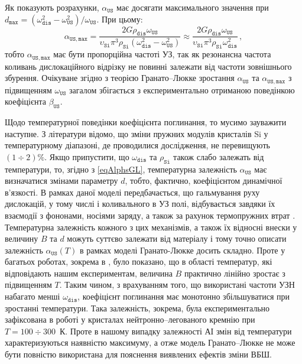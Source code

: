 \documentclass[a4paper,14pt,oneside,openany]{memoir}
\begin{document}
Як показують розрахунки, $\alpha_\mathtt{US}$ має досягати максимального значення при
$d_\mathtt{max}=(\omega_\mathtt{dis}^2 - \omega_\mathtt{US}^2)/\omega_\mathtt{US}$.
При цьому:
\begin{equation}
\label{eqAlGLmax}
\alpha_\mathtt{US,max}=\frac{2G\rho_\mathtt{dis}\omega_\mathtt{US}}{\upsilon_\mathtt{Si}\pi^3\rho_\mathtt{Si}(\omega_\mathtt{dis}^2-\omega_\mathtt{US}^2)}
\approx\frac{2G\rho_\mathtt{dis}\omega_\mathtt{US}}{\upsilon_\mathtt{Si}\pi^3\rho_\mathtt{Si}\omega_\mathtt{dis}^2}\,,
\end{equation}
тобто $\alpha_\mathtt{US,max}$ має бути пропорційна частоті УЗ,
так як резонансна частота коливань дислокаційного відрізку не повинні залежати від частоти зовнішнього збурення.
Очікуване згідно з теорією Гранато--Люкке зростання $\alpha_\mathtt{US}$ та $\alpha_\mathtt{US,max}$ з підвищенням $\omega_\mathtt{US}$ загалом
збігається з експериментально отриманою поведінкою коефіцієнта $\beta_\mathtt{US}$.

Щодо температурної поведінки коефіцієнта поглинання, то мусимо зауважити наступне.
З літератури \cite{Si_C:Temp} відомо, що зміни пружних модулів кристалів Si у температурному діапазоні, де проводилися дослідження, не перевищують $(1\div2)\%$.
Якщо припустити, що $\omega_\mathtt{dis}$ та $\rho_\mathtt{Si}$ також слабо залежать від температури, то, згідно з \eqref{eqAlphsGL}, температурна залежність $\alpha_\mathtt{US}$ має визначатися змінами параметру $d$, тобто, фактично, коефіцієнтом динамічної в'язкості.
В рамках даної моделі передбачається, що гальмування руху дислокацій, у тому числі і коливального в УЗ полі,
відбувається завдяки їх взаємодії з фононами, носіями заряду, а також за рахунок термопружних втрат \cite{Granato,Sudz,True}.
Температурна залежність кожного з цих механізмів, а також їх відносні внески у величину $B$ та $d$ можуть суттєво залежати від матеріалу і тому точно описати залежність $\alpha_\mathtt{US}(T)$ в рамках моделі Гранато-Люкке досить складно.
Проте у багатьох роботах, зокрема в \cite{True}, було показано, що в області  температур,
які відповідають нашим експериментам, величина $B$ практично лінійно зростає з підвищенням $T$.
Таким чином, з врахуванням того, що використані частоти УЗН набагато менші $\omega_\mathtt{dis}$, коефіцієнт поглинання має монотонно збільшуватися при зростанні температури.
Така залежність, зокрема, була експериментально зафіксована в роботі \cite{YOlikh:USadsorb} у кристалах нейтронно--легованого кремнію при $T=100\div300$~К.
Проте в нашому випадку залежності АІ змін від температури характеризуються наявністю максимуму, а отже
модель Гранато--Люкке не може бути повністю використана для пояснення виявлених ефектів зміни ВБШ.
\end{document}
